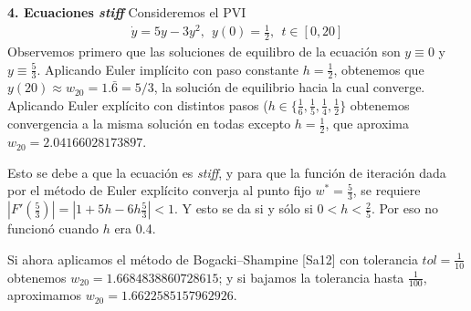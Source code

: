 \documentclass[11pt]{article}
\begin{document}
$ $\\

\noindent
\textbf{4. Ecuaciones \textit{stiff}}
\newline
Consideremos el PVI
\begin{align*}
\dot{y} = 5y-3y^2, \ \ y(0) = \frac{1}{2}, \ \ t \in [0,20]
\end{align*}
Observemos primero que las soluciones de equilibro de la ecuación son $y \equiv 0$ y 
$y \equiv \frac{5}{3}$.
Aplicando Euler implícito con paso constante $h = \frac{1}{2}$, obtenemos que
$y(20) \approx w_{20} = 1.\bar{6} = 5/3$, la solución de equilibrio hacia
la cual converge.
Aplicando Euler explícito con distintos pasos ($h \in \{\frac{1}{6}, \frac{1}{5}, 
\frac{1}{4}, \frac{1}{2} \}$ obtenemos convergencia a la misma solución en todas
excepto $h = \frac{1}{2}$, que aproxima $w_{20} = 2.04166028173897$.

Esto se debe a que la ecuación es \textit{stiff}, y para que la función de iteración
dada por el método de Euler explícito converja al punto fijo $w^* = \frac{5}{3}$, se
requiere $|F'(\frac{5}{3})| = |1+5h-6h\frac{5}{3}|<1$. Y esto se da si y sólo si 
$0 < h < \frac{2}{5}$. Por eso no funcionó cuando $h$ era 0.4.

Si ahora aplicamos el método de Bogacki–Shampine [Sa12]  con tolerancia $tol = 
\frac{1}{10}$  obtenemos $w_{20} = 1.6684838860728615$; y si bajamos la tolerancia 
hasta  $\frac{1}{100}$, aproximamos $w_{20} = 1.6622585157962926$. 
\end{document}
